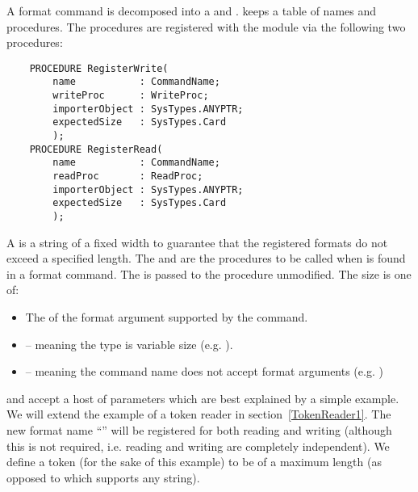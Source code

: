 A format command is decomposed into a  and
.   keeps a table of
names and procedures.  The procedures are registered with the
module  via the following two procedures:

\begin{verbatim}
    PROCEDURE RegisterWrite(
        name           : CommandName;
        writeProc      : WriteProc;
        importerObject : SysTypes.ANYPTR;
        expectedSize   : SysTypes.Card
        );
    PROCEDURE RegisterRead(
        name           : CommandName;
        readProc       : ReadProc;
        importerObject : SysTypes.ANYPTR;
        expectedSize   : SysTypes.Card
        );
\end{verbatim}

A  is a string of a fixed width to guarantee
that the registered formats do not exceed a specified length.
The  and  are the procedures
to be called when  is found in a format command.
The  is passed to the procedure unmodified.
The  size is one of:
\begin{itemize}
\item
    The  of the format argument 
    supported by the command.
\item
     -- meaning the type is
    variable size (e.g. ).
\item
     -- meaning the command
    name does not accept format arguments (e.g. )
\end{itemize} 

 and  accept a host
of parameters which are best explained by a simple example.
We will extend the example of a token reader 
in section~\ref{TokenReader1}.  The new format name ``''
will be registered for both reading and writing (although this
is not required, i.e. reading and writing are completely independent).
We define a token (for the sake of this example) to be of a
maximum length (as opposed to  which supports
any string).

\section{}

